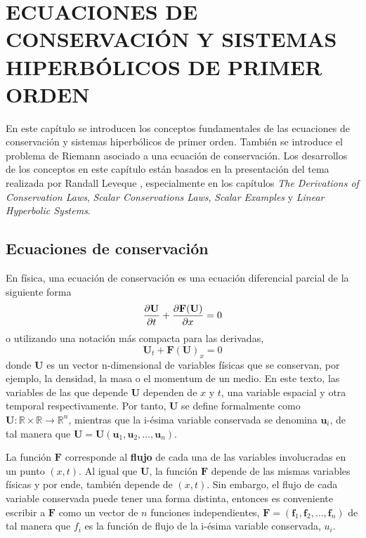 \chapter{ECUACIONES DE CONSERVACIÓN Y SISTEMAS HIPERBÓLICOS DE PRIMER ORDEN}
En este capítulo se introducen los conceptos fundamentales de las ecuaciones de conservación y sistemas hiperbólicos de primer orden. También se introduce el problema de Riemann asociado a una ecuación de conservación. Los desarrollos de los conceptos en este capítulo están basados en la presentación del tema realizada por Randall Leveque \cite{Leveque}, especialmente en los capítulos \textit{The Derivations of Conservation Laws}, \textit{Scalar Conservations Laws}, \textit{Scalar Examples} y \textit{Linear Hyperbolic Systems}.
\section{Ecuaciones de conservación}
\label{sec:ecuaciones-de-conservacion}
En física, una ecuación de conservación es una ecuación diferencial parcial de la siguiente forma
\begin{equation}
	\pdv{\mathbf{U}}{t} + \pdv{\mathbf{F}(\mathbf{U})}{x} = 0
	\label{eq:conservacion}
\end{equation}
o utilizando una notación más compacta para las derivadas,
\begin{equation}
	\mathbf{U}_{t} + \mathbf{F}(\mathbf{U})_{x} = 0
	\label{eq:conserv-deriv-short}
\end{equation}
donde $\mathbf{U}$ es un vector n-dimensional de variables físicas que se conservan, por ejemplo, la densidad, la masa o el momentum de un medio. En este texto, las variables de las que depende $\mathbf{U}$ dependen de $x$ y $t$, una variable espacial y otra temporal respectivamente. Por tanto, $\mathbf{U}$ se define formalmente como $\mathbf{U} : \mathbb{R} \times  \mathbb{R} \rightarrow \mathbb{R}^{n}$, mientras que la i-ésima variable conservada se denomina $\mathbf{u}_{i}$, de tal manera que $\mathbf{U} = \mathbf{U}(\mathbf{u}_{1}, \mathbf{u}_{2}, \dots, \mathbf{u}_{n})$. 

La función $\mathbf{F}$ corresponde al \textbf{flujo} de cada una de las variables involucradas en un punto $(x,t)$. Al igual que $\mathbf{U}$, la función $\mathbf{F}$ depende de las mismas variables físicas y por ende, también depende de $(x,t)$. Sin embargo, el flujo de cada variable conservada puede tener una forma distinta, entonces es conveniente escribir a $\mathbf{F}$ como un vector de $n$ funciones independientes, $\mathbf{F} = (\mathbf{f}_{1}, \mathbf{f}_{2}, \dots, \mathbf{f}_{n})$
de tal manera que $f_i$ es la función de flujo de la i-ésima variable conservada, $u_i$.

